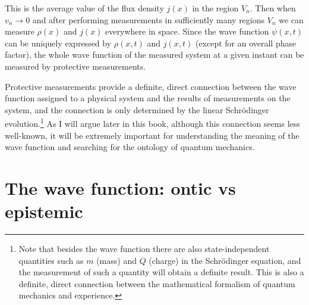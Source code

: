\noindent This is the average value of the flux density $j(x)$ in the region $V_n$. Then when $v_n \rightarrow 0$ and after performing measurements in sufficiently many regions $V_n$ we can measure $\rho(x)$ and $j(x)$ everywhere in space.
Since the wave function $\psi(x,t)$ can be uniquely expressed by $\rho(x,t)$ and $j(x,t)$ (except for an overall phase factor), the whole wave function of the measured system at a given instant can be measured by protective measurements.

Protective measurements provide a definite, direct connection between the wave function assigned to a physical system and the results of measurements on the system, and the connection is only determined by the linear Schr\"{o}dinger evolution.\footnote{Note that besides the wave function there are also state-independent quantities such as $m$ (mass) and $Q$ (charge) in the Schr\"{o}dinger equation, and the measurement of such a quantity will obtain a definite result. This is also a definite, direct connection between the mathematical formalism of quantum mechanics and experience.} As I will argue later in this book, although this connection seems less well-known, it will be extremely important for understanding the meaning of the wave function and searching for the ontology of quantum mechanics.




\chapter{The wave function: ontic vs epistemic}


